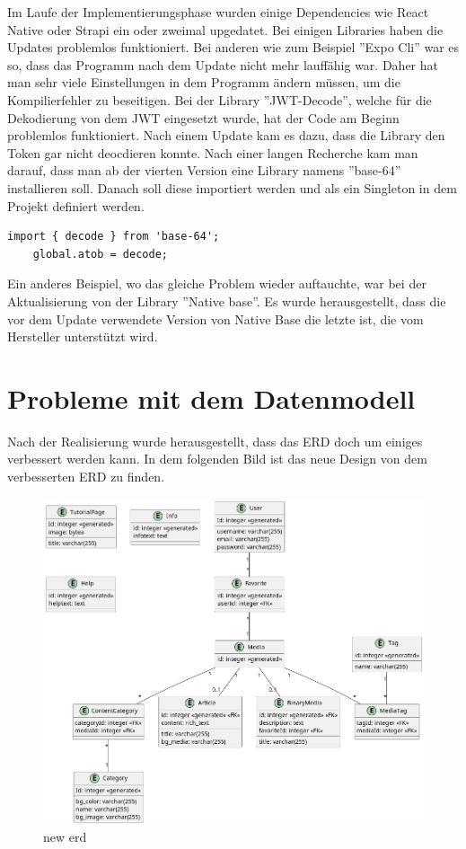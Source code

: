 Im Laufe der Implementierungsphase wurden einige Dependencies wie React Native oder Strapi ein oder zweimal upgedatet. Bei einigen Libraries haben die Updates problemlos funktioniert. Bei anderen wie zum Beispiel ''Expo Cli'' war es so, dass das Programm nach dem Update nicht mehr lauffähig war. Daher hat man sehr viele Einstellungen in dem Programm ändern müssen, um die Kompilierfehler zu beseitigen.
Bei der Library ''JWT-Decode'', welche  für die Dekodierung von dem JWT eingesetzt wurde, hat der Code am Beginn problemlos funktioniert. Nach einem Update kam es dazu, dass die Library den Token gar nicht deocdieren konnte.
Nach einer langen Recherche kam man darauf, dass man ab der vierten Version eine Library namens ''base-64'' installieren soll.
Danach soll diese importiert werden und als ein Singleton in dem Projekt definiert werden.
\begin{lstlisting}[caption=base-64 als Singleton]
    import { decode } from 'base-64';
    global.atob = decode;
    \end{lstlisting}
\cite{jwt-decode-bug}

Ein anderes Beispiel, wo das gleiche Problem wieder auftauchte, war bei der Aktualisierung von der Library ''Native base''. Es wurde herausgestellt,
dass die vor dem Update verwendete Version von Native Base die letzte ist, die vom Hersteller unterstützt wird.



\section{Probleme mit dem Datenmodell}
Nach der Realisierung wurde herausgestellt, dass das ERD doch um einiges verbessert werden kann. In dem folgenden Bild ist das neue Design von dem verbesserten ERD zu finden.
\begin{figure}[H]
    \centering
    \includegraphics[width=\textwidth]{./pics/new-erd}
    \caption{new erd}
\end{figure}

